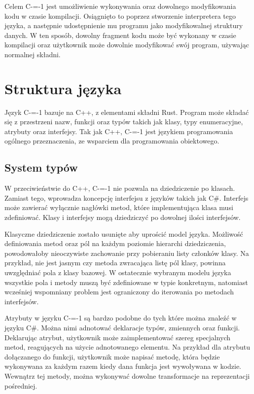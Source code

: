 \documentclass[conference]{IEEEtran}
\begin{document}
Celem C-=-1 jest umożliwienie wykonywania oraz dowolnego modyfikowania kodu w czasie kompilacji.
Osiągnięto to poprzez stworzenie interpretera tego języka, a następnie udostępnienie mu programu jako modyfikowalnej struktury danych.
W ten sposób, dowolny fragment kodu może być wykonany w czasie kompilacji oraz użytkownik może dowolnie modyfikować swój program, używając normalnej składni.

\section{Struktura języka}

Język C-=-1 bazuje na C++, z elementami składni Rust.
Program może składać się z przestrzeni nazw, funkcji oraz typów takich jak klasy, typy enumeracyjne, atrybuty oraz interfejsy.
Tak jak C++, C-=-1 jest językiem programowania ogólnego przeznaczenia, ze wsparciem dla programowania obiektowego.

\subsection{System typów}

W przeciwieństwie do C++, C-=-1 nie pozwala na dziedziczenie po klasach.
Zamiast tego, wprowadza koncepcję interfejsu z języków takich jak C\#.
Interfejs może zawierać wyłącznie nagłówki metod, które implementująca klasa musi zdefiniować.
Klasy i interfejsy mogą dziedziczyć po dowolnej ilości interfejsów.

Klasyczne dziedziczenie zostało usunięte aby uprościć model języka.
Możliwość definiowania metod oraz pól na każdym poziomie hierarchi dziedziczenia, powodowałoby nieoczywiste zachowanie przy pobieraniu listy członków klasy.
Na przykład, nie jest jasnym czy metoda zwracająca listę pól klasy, powinna uwzględniać pola z klasy bazowej.
W ostatecznie wybranym modelu języka wszystkie pola i metody muszą być zdefiniowane w typie konkretnym, natomiast wcześniej wspomniany problem jest ograniczony do iterowania po metodach interfejsów.

Atrybuty w języku C-=-1 są bardzo podobne do tych które  można znaleźć w języku C\#.
Można nimi adnotować deklaracje typów, zmiennych oraz funkcji.
Deklarując atrybut, użytkownik może zaimplementować szereg specjalnych metod, reagujących na użycie adnotowanego elementu.
Na przykład dla atrybutu dołączanego do funkcji, użytkownik może napisać metodę, która będzie wykonywana za każdym razem kiedy dana funkcja jest wywoływana w kodzie.
Wewnątrz tej metody, można wykonywać dowolne transformacje na reprezentacji pośredniej.
\end{document}
